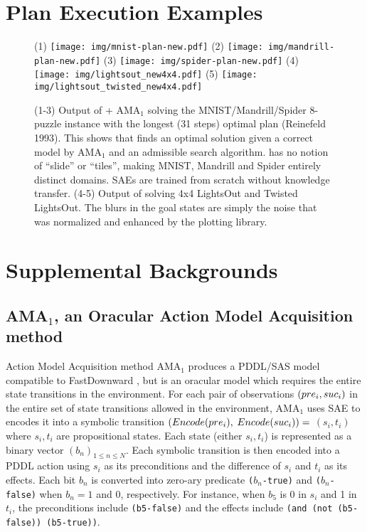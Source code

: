 \documentclass[10pt,letterpaper]{article}
\begin{document}
\section{Plan Execution Examples}

\begin{figure}[h]
 \centering
 (1)
 \texttt{[image: img/mnist-plan-new.pdf]}
 (2)
 \texttt{[image: img/mandrill-plan-new.pdf]}
 (3)
 \texttt{[image: img/spider-plan-new.pdf]}
 (4)
 \texttt{[image: img/lightsout\_new4x4.pdf]}
 (5)
 \texttt{[image: img/lightsout\_twisted\_new4x4.pdf]}
 \caption{
(1-3)
Output of \latentplanner + AMA$_1$ solving the MNIST/Mandrill/Spider 8-puzzle instance
with the longest (31 steps) optimal plan (Reinefeld 1993).
This shows that \latentplanner finds an optimal solution
given a correct model by AMA$_1$ and an admissible search algorithm.
\latentplanner has no notion of ``slide'' or ``tiles'',
making MNIST, Mandrill and Spider entirely distinct domains.
SAEs are trained from scratch without knowledge transfer.
(4-5) Output of solving 4x4 LightsOut and Twisted LightsOut.
The blurs in the goal states are simply the noise that was normalized and enhanced by the plotting library.
}
 \label{fig:mnist}
\end{figure}

\clearpage
\section{Supplemental Backgrounds}

\subsection{AMA$_1$, an Oracular Action Model Acquisition method}

Action Model Acquisition method AMA$_1$ produces a PDDL/SAS model compatible to
FastDownward \cite{Helmert04}, but is an oracular model which requires the entire state transitions
in the environment.
For each pair of observations ${\left(pre_i, suc_i\right)}$ in the entire set of state transitions allowed in the environment,
AMA$_1$ uses SAE to encodes it into 
a symbolic transition $(Encode(pre_i),$ $Encode(suc_i))=$ $(s_i,t_i)$ where $s_i,t_i$ are propositional states.
Each state (either $s_i,t_i$) is represented as a binary vector $(b_n)_{1\leq n \leq N}$.
Each symbolic transition is then encoded into a PDDL action 
using $s_i$ as its preconditions and the difference of $s_i$ and $t_i$ as its effects.
Each bit $b_n$ is converted into zero-ary predicate \texttt{($b_n$-true)} and \texttt{($b_n$-false)}
when $b_n=1$ and $0$, respectively.
For instance, when $b_5$ is 0 in $s_i$ and 1 in $t_i$,
the preconditions include \texttt{(b5-false)} and
the effects include \texttt{(and (not (b5-false)) (b5-true))}.
\end{document}
